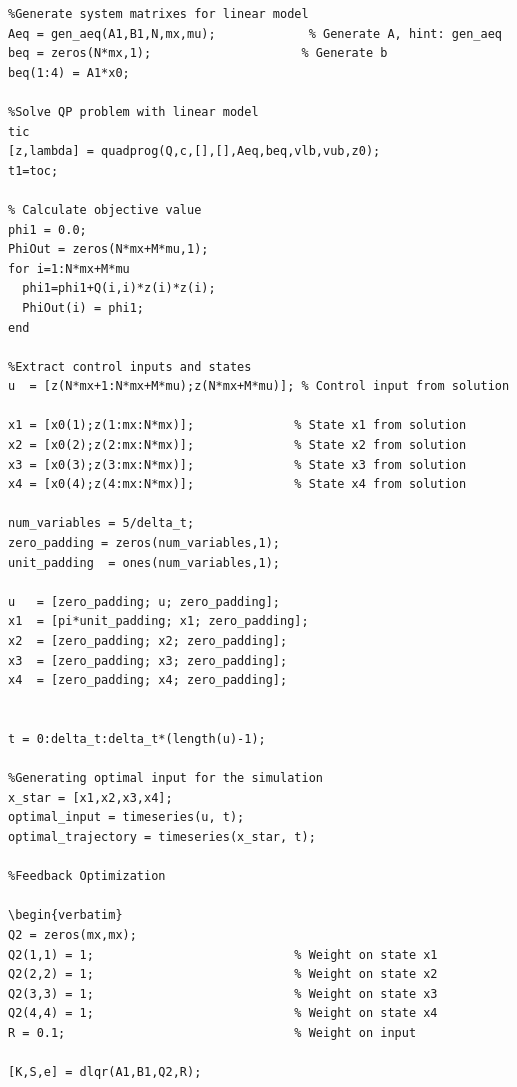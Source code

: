 \begin{verbatim}
%Generate system matrixes for linear model
Aeq = gen_aeq(A1,B1,N,mx,mu);             % Generate A, hint: gen_aeq
beq = zeros(N*mx,1);                     % Generate b
beq(1:4) = A1*x0;

%Solve QP problem with linear model
tic
[z,lambda] = quadprog(Q,c,[],[],Aeq,beq,vlb,vub,z0); 
t1=toc;

% Calculate objective value
phi1 = 0.0;
PhiOut = zeros(N*mx+M*mu,1);
for i=1:N*mx+M*mu
  phi1=phi1+Q(i,i)*z(i)*z(i);
  PhiOut(i) = phi1;
end

%Extract control inputs and states
u  = [z(N*mx+1:N*mx+M*mu);z(N*mx+M*mu)]; % Control input from solution

x1 = [x0(1);z(1:mx:N*mx)];              % State x1 from solution
x2 = [x0(2);z(2:mx:N*mx)];              % State x2 from solution
x3 = [x0(3);z(3:mx:N*mx)];              % State x3 from solution
x4 = [x0(4);z(4:mx:N*mx)];              % State x4 from solution

num_variables = 5/delta_t;
zero_padding = zeros(num_variables,1);
unit_padding  = ones(num_variables,1);

u   = [zero_padding; u; zero_padding];
x1  = [pi*unit_padding; x1; zero_padding];
x2  = [zero_padding; x2; zero_padding];
x3  = [zero_padding; x3; zero_padding];
x4  = [zero_padding; x4; zero_padding];


t = 0:delta_t:delta_t*(length(u)-1);

%Generating optimal input for the simulation
x_star = [x1,x2,x3,x4];
optimal_input = timeseries(u, t);
optimal_trajectory = timeseries(x_star, t);

%Feedback Optimization

\begin{verbatim}
Q2 = zeros(mx,mx);
Q2(1,1) = 1;                            % Weight on state x1
Q2(2,2) = 1;                            % Weight on state x2
Q2(3,3) = 1;                            % Weight on state x3
Q2(4,4) = 1;                            % Weight on state x4
R = 0.1;                                % Weight on input

[K,S,e] = dlqr(A1,B1,Q2,R);
\end{verbatim}


